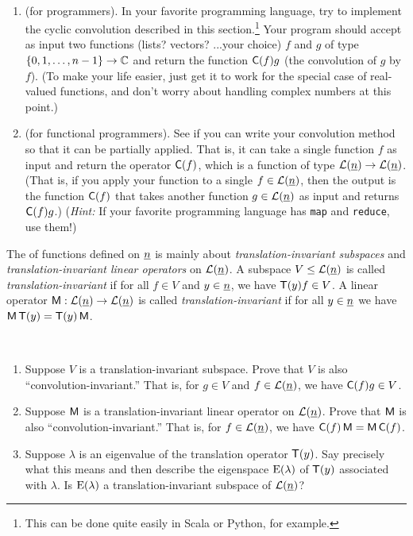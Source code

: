 \begin{exercise}
  ~
  \begin{enumerate}[{\bf a}]
  \item (for programmers).
    In your favorite programming language, 
    try to implement the cyclic convolution described 
    in this section.\footnote{This 
      can be done quite easily in Scala or Python, for example.}
    Your program should accept as input two functions 
    (lists? vectors? ...your choice) 
    $f$ and $g$ of type 
    $\{0,1,\dots, n-1\} \to \mathbb C$ and return the function
    $\mathsf{C}(f)g$ (the convolution of $g$ by $f$).  
    (To make your life easier, just get it to work for the special case of 
    real-valued functions, and don't worry about handling complex numbers at this point.)

  \item (for functional programmers). See if you can write your convolution
    method so that it can be partially applied.  That is, it can take
    a single function $f$ as input and return the operator $\mathsf{C}(f)$, 
    which is a function of type $\mathcal L(\underline{n}) \to \mathcal L(\underline{n})$.
    (That is, if you apply your function to a single $f\in \mathcal L(\underline{n})$, 
    then the output is the function $\mathsf{C}(f)$ that takes another
    function $g\in \mathcal L(\underline{n})$ as input and returns $\mathsf{C}(f)g$.)
  ({\it Hint:} If your favorite programming language has  
  {\tt map} and {\tt reduce}, use them!)
  \end{enumerate}
\end{exercise}

The \dsp of functions defined on $\underline{n}$ is mainly 
about \emph{translation-invariant subspaces} and
\emph{translation-invariant linear operators} on $\mathcal L(\underline{n})$.  
A subspace $V\leq \mathcal L(\underline{n})$ is called \emph{translation-invariant}
if for all $f\in V$ and $y\in \underline{n}$, we have $\mathsf{T}(y)f \in V$.
A linear operator $\mathsf{M} : \mathcal L(\underline{n}) \to \mathcal L(\underline{n})$ is called 
\emph{translation-invariant} if for all $y \in \underline{n}$ we have 
$\mathsf{M} \,\mathsf{T}(y) = \mathsf{T}(y) \,\mathsf{M}$.  

\begin{exercise}
  ~
  \begin{enumerate}[{\bf a.}]
  \item 
    Suppose $V$ is a translation-invariant subspace.
    Prove that $V$ is also ``convolution-invariant.''  That is,
    for $g\in V$ and $f\in \mathcal L(\underline{n})$, we have $\mathsf{C}(f)g \in V$.
  \item
    Suppose $\mathsf{M}$ is a translation-invariant linear operator 
    on $\mathcal L(\underline{n})$.
    Prove that $\mathsf{M}$ is also ``convolution-invariant.''  That is,
    for $f\in \mathcal L(\underline{n})$, we have $\mathsf{C}(f)\,\mathsf{M} = \mathsf{M} \,\mathsf{C}(f)$.
  \item Suppose $\lambda$ is an eigenvalue of the translation operator $\mathsf{T}(y)$.
    Say precisely what this means and then describe the eigenspace
    $\operatorname{E}(\lambda)$ of $\mathsf{T}(y)$ associated with $\lambda$.  Is 
    $\operatorname{E}(\lambda)$ a translation-invariant subspace of $\mathcal L(\underline{n})$?
  \end{enumerate}
\end{exercise}

